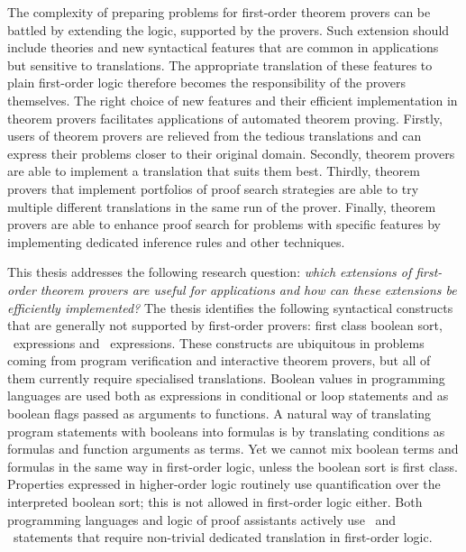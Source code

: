 The complexity of preparing problems for first-order theorem provers can be battled by extending the logic, supported by the provers. Such extension should include theories and new syntactical features that are common in applications but sensitive to translations. The appropriate translation of these features to plain first-order logic therefore becomes the responsibility of the provers themselves. The right choice of new features and their efficient implementation in theorem provers facilitates applications of automated theorem proving. Firstly, users of theorem provers are relieved from the tedious translations and can express their problems closer to their original domain. Secondly, theorem provers are able to implement a translation that suits them best. Thirdly, theorem provers that implement portfolios of proof search strategies are able to try multiple different translations in the same run of the prover. Finally, theorem provers are able to enhance proof search for problems with specific features by implementing dedicated inference rules and other techniques.

This thesis addresses the following research question: \emph{which extensions of first-order theorem provers are useful for applications and how can these extensions be efficiently implemented?} The thesis identifies the following syntactical constructs that are generally not supported by first-order provers: first class boolean sort, \ITE\ expressions and \LETIN\ expressions. These constructs are ubiquitous in problems coming from program verification and interactive theorem provers, but all of them currently require specialised translations. Boolean values in programming languages are used both as expressions in conditional or loop statements and as boolean flags passed as arguments to functions. A natural way of translating program statements with booleans into formulas is by translating conditions as formulas and function arguments as terms. Yet we cannot mix boolean terms and formulas in the same way in first-order logic, unless the boolean sort is first class. Properties expressed in higher-order logic routinely use quantification over the interpreted boolean sort; this is not allowed in first-order logic either. Both programming languages and logic of proof assistants actively use \ITE\ and \LETIN\ statements that require non-trivial dedicated translation in first-order logic.


